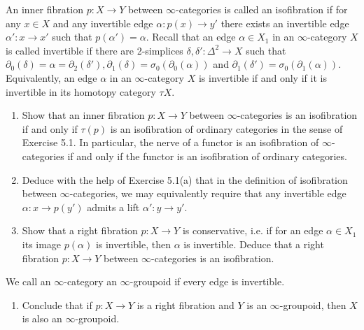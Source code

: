 \begin{Exercise}
	An inner fibration $ p \colon X \to Y $ between $ \infty $-categories is called an isofibration if for any $ x \in X $ and any invertible edge $ \alpha \colon p ( x ) \to y' $ there exists an invertible edge $ \alpha' \colon x \to x' $ such that $ p ( \alpha' ) = \alpha $.
	Recall that an edge $ \alpha \in X_1 $ in an $ \infty $-category $ X $ is called invertible if there are 2-simplices $ \delta, \delta' \colon \Delta^2 \to X $ such that $ \partial_0 ( \delta ) = \alpha = \partial_2 ( \delta' ) , \partial_1 ( \delta ) = \sigma_0 ( \partial_0 ( \alpha ) ) $ and $ \partial_1 ( \delta' ) = \sigma_0 ( \partial_1 ( \alpha ) ) $.
	Equivalently, an edge $ \alpha $ in an $ \infty $-category $ X $ is invertible if and only if it is invertible in its homotopy category $ \tau X $.
	
	\begin{enumerate}[label=(\alph*)]
		\item 
		Show that an inner fibration $ p \colon X \to Y $ between $ \infty $-categories is an isofibration if and only if $ \tau ( p ) $
		is an isofibration of ordinary categories in the sense of Exercise 5.1. In particular, the nerve of a
		functor is an isofibration of $ \infty $-categories if and only if the functor is an isofibration of ordinary categories.
		
		\item 
		Deduce with the help of Exercise 5.1(a) that in the definition of isofibration between $ \infty $-categories, we may equivalently require that any invertible edge $ \alpha \colon x \to p ( y' ) $ admits a lift $ \alpha' \colon y \to y'$.
		
		\item 
		Show that a right fibration $ p \colon X \to Y $ is conservative, i.e. if for an edge $ \alpha \in X_1 $ its image $ p ( \alpha ) $ is invertible, then $ \alpha $ is invertible.
		Deduce that a right fibration $ p \colon X \to Y $ between $ \infty $-categories is an isofibration.
	\end{enumerate}
	
	We call an $ \infty $-category an $ \infty $-groupoid if every edge is invertible.
	
	\begin{enumerate}[label=(\alph*),resume]
		\item
		Conclude that if $ p \colon X \to Y $ is a right fibration and $ Y $ is an $ \infty $-groupoid, then $ X $ is also an $ \infty $-groupoid. 
	\end{enumerate}
\end{Exercise}

